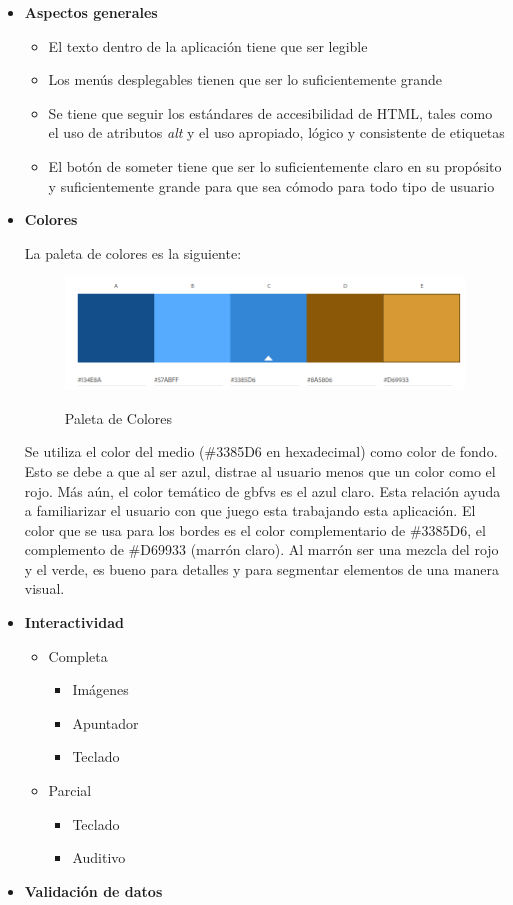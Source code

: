 \begin{itemize}
    \item \textbf{Aspectos generales}
    \begin{itemize}
        \item El texto dentro de la aplicación tiene que ser legible
        \item Los menús desplegables tienen que ser lo suficientemente grande
        \item Se tiene que seguir los estándares de accesibilidad de HTML, tales como el uso de atributos \textit{alt} y el uso apropiado, lógico y consistente de etiquetas
        \item El botón de someter tiene que ser lo suficientemente claro en su propósito y suficientemente grande para que sea cómodo para todo tipo de usuario
    \end{itemize}
    \item \textbf{Colores}
    
    La paleta de colores es la siguiente:
    \begin{figure}[ht!]
        \centering
        \caption{Paleta de Colores}
        \includegraphics[width=1.0\textwidth]{figures/pallete_updated.png}
        \label{fig: pallete}
    \end{figure}

    Se utiliza el color del medio (\#3385D6 en hexadecimal) como color de fondo. Esto se debe a que al ser azul, distrae al usuario menos que un color como el rojo. Más aún, el color temático de \gls{gbfvs} es el azul claro. Esta relación ayuda a familiarizar el usuario con que juego esta trabajando esta aplicación. El color que se usa para los bordes es el color complementario de \#3385D6, el complemento de \#D69933 (marrón claro). Al marrón ser una mezcla del rojo y el verde, es bueno para detalles y para segmentar elementos de una manera visual.
    \item \textbf{Interactividad}
    \begin{itemize}
        \item Completa
        \begin{itemize}
            \item Imágenes
            \item Apuntador
            \item Teclado
        \end{itemize}
        \item Parcial
        \begin{itemize}
            \item Teclado
            \item Auditivo
        \end{itemize}
    \end{itemize}
    \item \textbf{Validación de datos}
    

\end{itemize}
